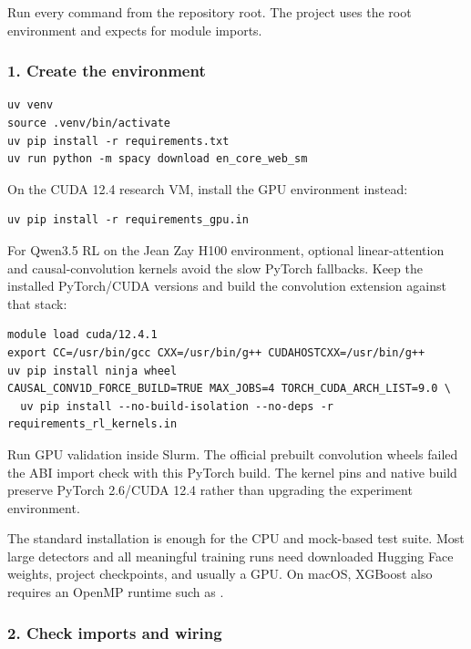 Run every command from the repository root. The project uses the root
\texttt{} environment and expects
\texttt{} for module imports.

\subsubsection{1. Create the
environment}\label{record-docs-research-guide-md-create-the-environment}

\begin{Verbatim}
uv venv
source .venv/bin/activate
uv pip install -r requirements.txt
uv run python -m spacy download en_core_web_sm
\end{Verbatim}

On the CUDA 12.4 research VM, install the GPU environment instead:

\begin{Verbatim}
uv pip install -r requirements_gpu.in
\end{Verbatim}

For Qwen3.5 RL on the Jean Zay H100 environment, optional
linear-attention and causal-convolution kernels avoid the slow PyTorch
fallbacks. Keep the installed PyTorch/CUDA versions and build the
convolution extension against that stack:

\begin{Verbatim}
module load cuda/12.4.1
export CC=/usr/bin/gcc CXX=/usr/bin/g++ CUDAHOSTCXX=/usr/bin/g++
uv pip install ninja wheel
CAUSAL_CONV1D_FORCE_BUILD=TRUE MAX_JOBS=4 TORCH_CUDA_ARCH_LIST=9.0 \
  uv pip install --no-build-isolation --no-deps -r requirements_rl_kernels.in
\end{Verbatim}

Run GPU validation inside Slurm. The official prebuilt convolution
wheels failed the ABI import check with this PyTorch build. The kernel
pins and native build preserve PyTorch 2.6/CUDA 12.4 rather than
upgrading the experiment environment.

The standard installation is enough for the CPU and mock-based test
suite. Most large detectors and all meaningful training runs need
downloaded Hugging Face weights, project checkpoints, and usually a GPU.
On macOS, XGBoost also requires an OpenMP runtime such as
\texttt{}.

\subsubsection{2. Check imports and
wiring}\label{record-docs-research-guide-md-check-imports-and-wiring}

